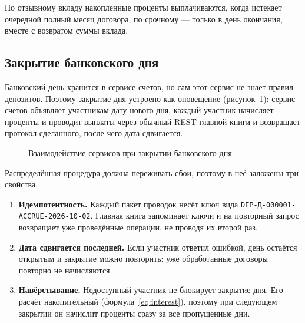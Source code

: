 \documentclass[14pt,a4paper]{extarticle}
\begin{document}
По отзывному вкладу накопленные проценты выплачиваются, когда истекает очередной полный
месяц договора; по срочному --- только в день окончания, вместе с возвратом суммы вклада.

\subsection{Закрытие банковского дня}

Банковский день хранится в сервисе счетов, но сам этот сервис не знает правил
депозитов. Поэтому закрытие дня устроено как оповещение
(рисунок~\ref{fig:dayclose}): сервис счетов объявляет участникам дату нового дня, каждый
участник начисляет проценты и проводит выплаты через обычный REST главной книги и
возвращает протокол сделанного, после чего дата сдвигается.

\begin{figure}[H]
\centering
{}
\caption{Взаимодействие сервисов при закрытии банковского дня}
\label{fig:dayclose}
\end{figure}

Распределённая процедура должна переживать сбои, поэтому в неё заложены три свойства.
\begin{enumerate}
\item \textbf{Идемпотентность.} Каждый пакет проводок несёт ключ вида
\texttt{DEP-Д-000001-ACCRUE-2026-10-02}. Главная книга запоминает ключи и на повторный запрос
возвращает уже проведённые операции, не проводя их второй раз.
\item \textbf{Дата сдвигается последней.} Если участник ответил ошибкой, день остаётся
открытым и закрытие можно повторить: уже обработанные договоры повторно не начисляются.
\item \textbf{Навёрстывание.} Недоступный участник не блокирует закрытие дня. Его расчёт
накопительный (формула~\ref{eq:interest}), поэтому при следующем закрытии он начислит
проценты сразу за все пропущенные дни.
\end{enumerate}
\end{document}
